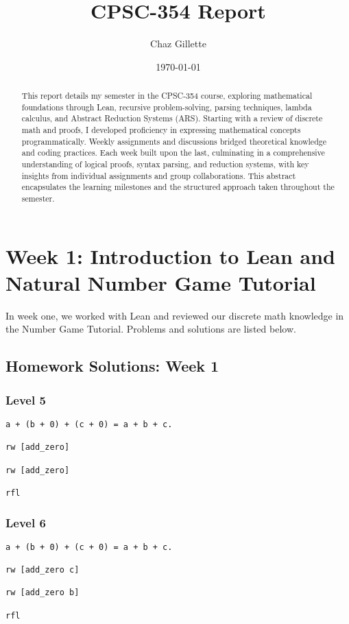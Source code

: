 \documentclass{article}
\title{CPSC-354 Report}
\author{Chaz Gillette}
\date{\today}
\begin{document}
\maketitle
\begin{abstract}
    This report details my semester in the CPSC-354 course, exploring mathematical foundations through Lean, recursive problem-solving, parsing techniques, lambda calculus, and Abstract Reduction Systems (ARS). Starting with a review of discrete math and proofs, I developed proficiency in expressing mathematical concepts programmatically. Weekly assignments and discussions bridged theoretical knowledge and coding practices. Each week built upon the last, culminating in a comprehensive understanding of logical proofs, syntax parsing, and reduction systems, with key insights from individual assignments and group collaborations. This abstract encapsulates the learning milestones and the structured approach taken throughout the semester.
\end{abstract}

\tableofcontents
\newpage

\section{Week 1: Introduction to Lean and Natural Number Game Tutorial}
\label{sec:week1}

In week one, we worked with Lean and reviewed our discrete math knowledge in the Number Game Tutorial. Problems and solutions are listed below.

\subsection*{Homework Solutions: Week 1}

\subsubsection*{Level 5}
\begin{lstlisting}[style=leanstyle]
a + (b + 0) + (c + 0) = a + b + c.

rw [add_zero]

rw [add_zero]

rfl
\end{lstlisting}

\subsubsection*{Level 6}
\begin{lstlisting}[style=leanstyle]
a + (b + 0) + (c + 0) = a + b + c.

rw [add_zero c]

rw [add_zero b]

rfl
\end{lstlisting}
\end{document}
